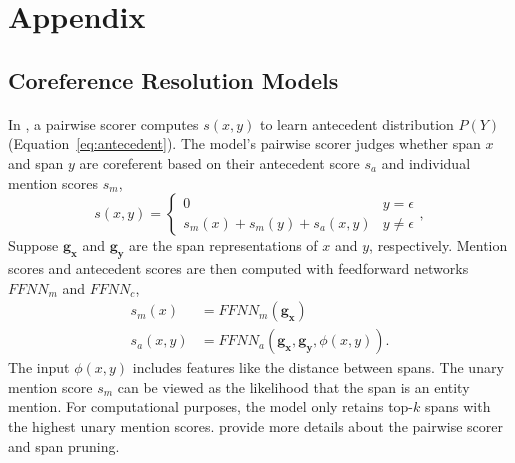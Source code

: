 \clearpage
\appendix
\section{Appendix}
\label{sec:appendix}

\subsection{Coreference Resolution Models}
\label{ssec:neural}

\paragraph{\ctof}

In \ctof{},
a pairwise scorer computes $s(x,y)$ to learn antecedent distribution $P(Y)$
(Equation~\ref{eq:antecedent}).
The model's pairwise scorer judges whether span $x$ and span $y$ are
coreferent based on their antecedent score $s_a$ and individual mention scores
$s_m$,
\begin{equation}
    s(x,y) =
        \begin{cases}
            0  & y=\epsilon\\
            s_m(x) + s_m(y) + s_a(x,y) & y \neq \epsilon
        \end{cases},
    \label{eq:pairwise}
\end{equation}
Suppose $\bm{g_x}$ and $\bm{g_y}$ are the span representations of $x$ and $y$,
respectively.
Mention scores and antecedent scores are then computed with feedforward networks
$FFNN_m$ and $FFNN_c$,
\begin{align}
    \label{eq:unary}
s_m(x) &= FFNN_m(\bm{g_x}) \\
s_a(x,y) &= FFNN_a(\bm{g_x}, \bm{g_y}, \phi(x,y)).
\end{align}
The input $\phi(x,y)$ includes features like the distance between spans.
The unary mention score $s_m$ can be viewed as the likelihood that the span is
an entity mention. For computational purposes, the \ctof{} model only retains
top-$k$ spans with the highest unary mention scores. \citet{lee-2018} provide more details about the pairwise scorer and span pruning.

